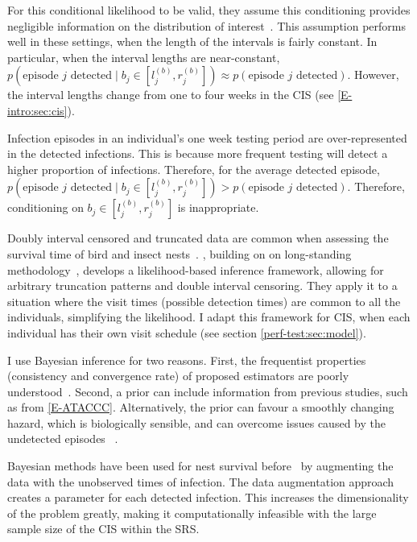\documentclass[thesis.tex]{subfiles}
\begin{document}
For this conditional likelihood to be valid, they assume this conditioning provides negligible information on the distribution of interest~.
This assumption performs well in these settings, when the length of the intervals is fairly constant.
In particular, when the interval lengths are near-constant, $p(\text{episode $j$ detected} \mid b_j \in [l_j^{(b)}, r_j^{(b)}]) \approx p(\text{episode $j$ detected})$.
However, the interval lengths change from one to four weeks in the CIS (see \cref{E-intro:sec:cis}).

Infection episodes in an individual's one week testing period are over-represented in the detected infections.
This is because more frequent testing will detect a higher proportion of infections.
Therefore, for the average detected episode, $p(\text{episode $j$ detected} \mid b_j \in [l_j^{(b)}, r_j^{(b)}]) > p(\text{episode $j$ detected})$.
Therefore, conditioning on $b_j \in [l_j^{(b)}, r_j^{(b)}]$ is inappropriate.

Doubly interval censored and truncated data are common when assessing the survival time of bird and insect nests~\autocite{heiseyABCs}.
\textcite{heiseyModelling}, building on on long-standing methodology~\autocite{dempsterMaximum,turnbullEmpirical}, develops a likelihood-based inference framework, allowing for arbitrary truncation patterns and double interval censoring.
They apply it to a situation where the visit times (possible detection times) are common to all the individuals, simplifying the likelihood.
I adapt this framework for CIS, when each individual has their own visit schedule (see section \cref{perf-test:sec:model}).

I use Bayesian inference for two reasons.
First, the frequentist properties (\eg consistency and convergence rate) of proposed estimators are poorly understood~\autocite{sunAnalysis,dengNonparametric}.
Second, a prior can include information from previous studies, such as from \cref{E-ATACCC}.
Alternatively, the prior can favour a smoothly changing hazard, which is biologically sensible, and can overcome issues caused by the undetected episodes ~\autocite{caoBias}.

Bayesian methods have been used for nest survival before~\autocite{heBayesiana,heBayesian,caoModeling} by augmenting the data with the unobserved times of infection.
The data augmentation approach creates a parameter for each detected infection.
This increases the dimensionality of the problem greatly, making it computationally infeasible with the large sample size of the CIS within the SRS.
\end{document}
